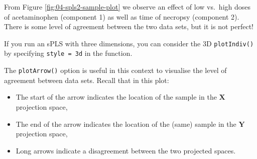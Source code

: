 \documentclass[
]{book}
\newenvironment{Shaded}{\begin{snugshade}}{\end{snugshade}}
\newcommand{\AttributeTok}[1]{\textcolor[rgb]{0.77,0.63,0.00}{#1}}
\newcommand{\ConstantTok}[1]{\textcolor[rgb]{0.00,0.00,0.00}{#1}}
\newcommand{\DecValTok}[1]{\textcolor[rgb]{0.00,0.00,0.81}{#1}}
\newcommand{\FunctionTok}[1]{\textcolor[rgb]{0.00,0.00,0.00}{#1}}
\newcommand{\NormalTok}[1]{#1}
\newcommand{\SpecialCharTok}[1]{\textcolor[rgb]{0.00,0.00,0.00}{#1}}
\newcommand{\StringTok}[1]{\textcolor[rgb]{0.31,0.60,0.02}{#1}}
\providecommand{\tightlist}{%
  \setlength{\itemsep}{0pt}\setlength{\parskip}{0pt}}
\begin{document}
From Figure \ref{fig:04-spls2-sample-plot} we observe an effect of low vs.~high doses of acetaminophen (component 1) as well as time of necropsy (component 2). There is some level of agreement between the two data sets, but it is not perfect!

If you run an sPLS with three dimensions, you can consider the 3D \texttt{plotIndiv()} by specifying \texttt{style\ =\ \textquotesingle{}3d} in the function.

The \texttt{plotArrow()} option is useful in this context to visualise the level of agreement between data sets. Recall that in this plot:

\begin{itemize}
\tightlist
\item
  The start of the arrow indicates the location of the sample in the \(\boldsymbol X\) projection space,
\item
  The end of the arrow indicates the location of the (same) sample in the \(\boldsymbol Y\) projection space,
\item
  Long arrows indicate a disagreement between the two projected spaces.
\end{itemize}

\begin{Shaded}
\end{Shaded}
\end{document}
